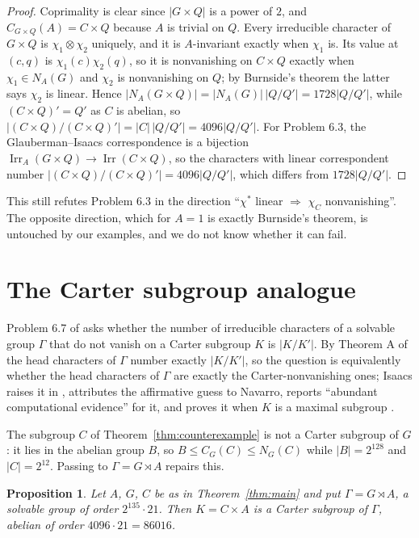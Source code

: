 \documentclass[11pt]{article}
\newtheorem{proposition}[theorem]{Proposition}
\theoremstyle{definition}
\theoremstyle{remark}
\newcommand{\Irr}{\operatorname{Irr}}
\begin{document}
\begin{proof}
Coprimality is clear since $|G\times Q|$ is a power of $2$, and
$C_{G\times Q}(A)=C\times Q$ because $A$ is trivial on $Q$.  Every
irreducible character of $G\times Q$ is $\chi_1\otimes\chi_2$ uniquely,
and it is $A$-invariant exactly when $\chi_1$ is.  Its value at
$(c,q)$ is $\chi_1(c)\chi_2(q)$, so it is nonvanishing on $C\times Q$
exactly when $\chi_1\in N_A(G)$ and $\chi_2$ is nonvanishing on $Q$; by
Burnside's theorem the latter says $\chi_2$ is linear.  Hence
$|N_A(G\times Q)|=|N_A(G)|\,|Q/Q'|=1728|Q/Q'|$, while
$(C\times Q)'=Q'$ as $C$ is abelian, so
$|(C\times Q)/(C\times Q)'|=|C|\,|Q/Q'|=4096|Q/Q'|$.  For Problem 6.3,
the Glauberman--Isaacs correspondence is a bijection
$\Irr_A(G\times Q)\to\Irr(C\times Q)$, so the characters with linear
correspondent number $|(C\times Q)/(C\times Q)'|=4096|Q/Q'|$, which
differs from $1728|Q/Q'|$.
\end{proof}

This still refutes Problem 6.3 in the direction
``$\chi^*$ linear $\Rightarrow$ $\chi_C$ nonvanishing''.  The opposite
direction, which for $A=1$ is exactly Burnside's theorem, is untouched
by our examples, and we do not know whether it can fail.

\section{The Carter subgroup analogue}\label{sec:carter}

Problem 6.7 of \cite{navarro-problems} asks whether the number of
irreducible characters of a solvable group $\Gamma$ that do not vanish
on a Carter subgroup $K$ is $|K/K'|$.  By Theorem A of
\cite{isaacs-carter} the head characters of $\Gamma$ number exactly
$|K/K'|$, so the question is equivalently whether the head characters of
$\Gamma$ are exactly the Carter-nonvanishing ones; Isaacs raises it in
\cite[\S6]{isaacs-carter}, attributes the affirmative guess to Navarro,
reports ``abundant computational evidence'' for it, and proves it when
$K$ is a maximal subgroup \cite[Theorem 6.1]{isaacs-carter}.

The subgroup $C$ of Theorem~\ref{thm:counterexample} is not a Carter
subgroup of $G$: it lies in the abelian group $B$, so
$B\le C_G(C)\le N_G(C)$ while $|B|=2^{128}$ and $|C|=2^{12}$.  Passing to
$\Gamma=G\rtimes A$ repairs this.

\begin{proposition}\label{prop:carter}
Let $A$, $G$, $C$ be as in Theorem~\ref{thm:main} and put
$\Gamma=G\rtimes A$, a solvable group of order $2^{135}\cdot21$.  Then
$K=C\times A$ is a Carter subgroup of $\Gamma$, abelian of order
$4096\cdot21=86016$.
\end{proposition}
\end{document}

